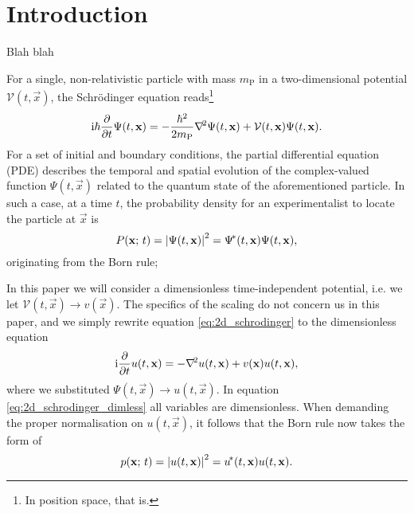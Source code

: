 \section{Introduction}\label{sec:introduction}


Blah blah 



For a single, non-relativistic particle with mass $m_\mathrm{P}$ in a two-dimensional potential $\mathcal{V}(t, \vec{x})$, the Schrödinger equation reads\footnote{In position space, that is. }
\begin{equation}\label{eq:2d_schrodinger}
    \mathrm{i} \hbar \pdv{}{t}\Psi(t, \mathbf{x}) = -\frac{\hbar^2}{2m_\mathrm{P}}\nabla^{\!2} \Psi(t, \mathbf{x})  + \mathcal{V}(t, \mathbf{x}) \Psi(t, \mathbf{x}).
\end{equation}
For a set of initial and boundary conditions, the partial differential equation (PDE) describes the temporal and spatial evolution of the complex-valued function $\Psi(t, \vec{x})$ related to the quantum state of the aforementioned particle. In such a case, at a time $t$, the probability density for an experimentalist to locate the particle at $\vec{x}$  is 
\begin{equation}\label{2d_bornrule}
    P(\mathbf{x}; \, t) = \abs{\Psi(t, \mathbf{x})}^2 = \Psi^{\!*}(t, \mathbf{x}) \Psi(t, \mathbf{x}),
\end{equation} 
originating from the Born rule; 

In this paper we will consider a dimensionless time-independent potential, i.e. we let $\mathcal{V}(t, \vec{x}) \to v(\vec{x})$. The specifics of the scaling do not concern us in this paper, and we simply rewrite equation \eqref{eq:2d_schrodinger} to the dimensionless equation
\begin{equation}\label{eq:2d_schrodinger_dimless}
    \mathrm{i} \pdv{}{t}u(t, \mathbf{x}) = - \nabla^{\!2}u(t, \mathbf{x})+ v(\mathbf{x})u(t, \mathbf{x}),
\end{equation}
where we substituted $\Psi(t, \vec{x}) \to u(t, \vec{x})$. In equation \eqref{eq:2d_schrodinger_dimless} all variables are dimensionless. When demanding the proper normalisation on $u(t,\vec{x})$, it follows that the Born rule now takes the form of
\begin{equation}\label{eq:2d_bornrule_dimless}
    p(\mathbf{x}; \, t) = \abs{u(t, \mathbf{x})}^2 = u^{\!*} (t, \mathbf{x})u(t, \mathbf{x}).
\end{equation}










